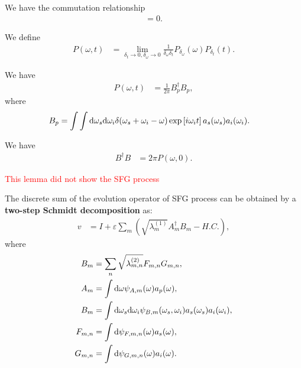 \documentclass[../../note.tex]{subfiles}
\begin{document}
\begin{lemma}
    We have the commutation relationship
    \begin{align}
        [P_{\delta_{\omega}}(\omega), P_{\delta_t}(t)] = 0.
    \end{align}
\end{lemma}

\begin{definition}
    We define
    \begin{align}
        P(\omega, t)
        &= \lim_{\delta_t \rightarrow 0, \delta_{\omega} \rightarrow 0} \frac{1}{\delta_{\omega} \delta_{t}} P_{\delta_{\omega}}(\omega) P_{\delta_{t}}(t).
    \end{align}
\end{definition}

\begin{lemma}
    We have
    \begin{align}
        P(\omega, t)
        &= \frac{1}{2 \pi} B_p^\dagger B_p,
    \end{align}
    where
    \begin{align}
        B_p
        &= \int \int {\rm d}\omega_s{\rm d}\omega_i \delta(\omega_s+\omega_i-\omega) \exp\left[i \omega_i t\right] a_s(\omega_s) a_i(\omega_i).
    \end{align}
\end{lemma}

\begin{lemma}
    We have
    \begin{align}
        B^\dagger B
        &= 2 \pi P(\omega, 0).
    \end{align}
\end{lemma}
\textcolor{red}{This lemma did not show the SFG process}

\begin{lemma}
    The discrete sum of the evolution operator of SFG process can be obtained by a \textbf{two-step Schmidt decomposition} as:
    \begin{align}
        v
        &= I + \varepsilon \sum_{m}\left(\sqrt{\lambda_m^{(1)}} A_m^\dagger B_m - H.C. \right),
    \end{align}
    where 
    \begin{align}
        B_m
        &= \sum_n \sqrt{\lambda_{m,n}^{(2)}} F_{m,n} G_{m,n}, \\
        A_m
        &= \int {\rm d}\omega \psi_{A,m}(\omega)a_p(\omega), \\
        B_m
        &= \int {\rm d}\omega_s{\rm d}\omega_i \psi_{B,m}(\omega_s, \omega_i) a_s(\omega_s)a_i(\omega_i), \\
        F_{m,n}
        &= \int{\rm d}\psi_{F,m,n}(\omega) a_s(\omega), \\
        G_{m,n}
        &= \int {\rm d}\psi_{G,m,n}(\omega)a_i(\omega).
    \end{align} 
\end{lemma}
\end{document}
